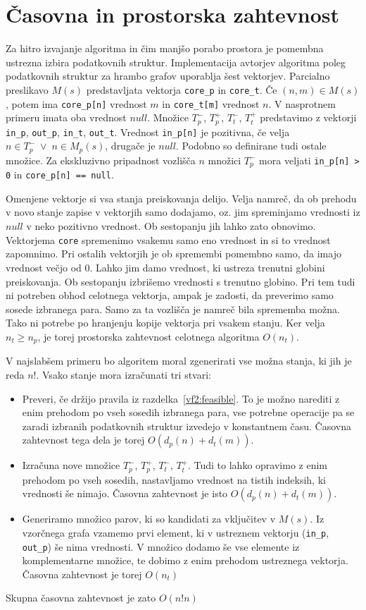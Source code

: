 \documentclass[a4paper, 12pt, ]{book}
\newcommand{\code}[1]{\mbox{\texttt{#1}}}
\begin{document}
	\section{Časovna in prostorska zahtevnost}
	\label{vf2:impl}
	Za hitro izvajanje algoritma in čim manjšo porabo prostora je pomembna ustrezna izbira podatkovnih struktur. Implementacija avtorjev algoritma	
	poleg podatkovnih struktur za hrambo grafov
	uporablja šest vektorjev. Parcialno preslikavo $M(s)$ predstavljata vektorja \code{core\_p} in \code{core\_t}. Če $(n,m) \in M(s)$, potem
	ima \code{core\_p[n]} vrednost $m$ in \code{core\_t[m]} vrednost $n$. V nasprotnem primeru imata oba vrednost $null$. Množice $T_p^-$, 
	$T_p^+$, $T_t^-$, $T_t^+$ predstavimo z vektorji \code{in\_p}, \code{out\_p}, \code{in\_t}, \code{out\_t}. Vrednost \code{in\_p[n]} je 
	pozitivna, če velja $n \in T_p^- \; \vee \; n \in M_p(s)$, drugače je $null$. Podobno so definirane tudi ostale množice. Za ekskluzivno pripadnost
	vozlišča $n$ množici $T_p^-$ mora veljati \code{in\_p[n] > 0} in \code{core\_p[n] == null}.
	
	Omenjene vektorje si vsa stanja preiskovanja delijo. Velja namreč, da ob prehodu v novo stanje zapise v vektorjih samo dodajamo, oz. jim spreminjamo
	vrednosti iz $null$ v neko pozitivno vrednost. Ob sestopanju jih lahko zato obnovimo. Vektorjema \code{core} spremenimo vsakemu samo eno vrednost in
	si to vrednost zapomnimo. Pri ostalih vektorjih je ob spremembi pomembno samo, da imajo vrednost večjo od 0. Lahko jim damo vrednost, ki ustreza
	trenutni globini preiskovanja. Ob sestopanju izbrišemo vrednosti s trenutno globino. Pri tem tudi ni potreben obhod celotnega vektorja,
	ampak je zadosti, da preverimo samo sosede izbranega para. Samo za ta vozlišča je namreč bila sprememba možna.
	Tako ni potrebe po hranjenju kopije vektorja pri vsakem stanju. Ker velja $n_t \geq n_p$, je torej prostorska zahtevnost celotnega algoritma $O(n_t)$.
	
	V najslabšem primeru bo algoritem moral zgenerirati vse možna stanja, ki jih je reda $n!$. Vsako stanje mora izračunati tri stvari:
	\begin{itemize}
	\item Preveri, če držijo pravila iz razdelka~\ref{vf2:feasible}. To je možno narediti z enim prehodom po vseh sosedih izbranega para, vse
	potrebne operacije pa se zaradi izbranih podatkovnih struktur izvedejo v konstantnem času. Časovna zahtevnost tega dela je torej $O(d_p(n) + d_t(m))$.
	\item Izračuna nove množice $T_p^-$, $T_p^+$, $T_t^-$, $T_t^+$. Tudi to lahko opravimo z enim prehodom po vseh sosedih, nastavljamo vrednost
	na tistih indeksih, ki vrednosti še nimajo. Časovna zahtevnost je isto $O(d_p(n) + d_t(m))$.
	\item Generiramo množico parov, ki so kandidati za vključitev v $M(s)$. Iz vzorčnega grafa vzamemo prvi element, ki v ustreznem vektorju (\code{in\_p},
	\code{out\_p}) še nima vrednosti. V množico dodamo še vse elemente iz komplementarne množice, te dobimo z enim prehodom ustreznega vektorja.
	Časovna zahtevnost je torej $O(n_t)$
	\end{itemize}
	Skupna časovna zahtevnost je zato $O(n!n)$
\end{document}
